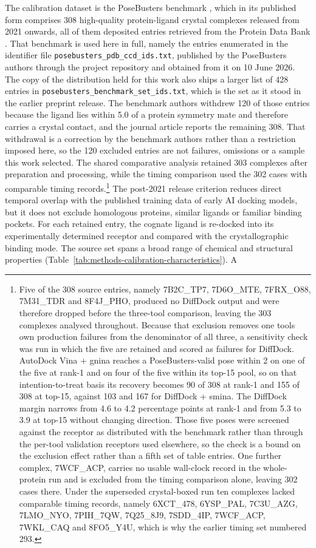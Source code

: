 The calibration dataset is the PoseBusters benchmark \cite{ref035}, which in its published form comprises 308 high-quality protein-ligand crystal complexes released from 2021 onwards, all of them deposited entries retrieved from the Protein Data Bank \cite{ref043}. That benchmark is used here in full, namely the entries enumerated in the identifier file \texttt{posebusters\_pdb\_ccd\_ids.txt}, published by the PoseBusters authors through the project repository and obtained from it on 10 June 2026. The copy of the distribution held for this work also ships a larger list of 428 entries in \texttt{posebusters\_benchmark\_set\_ids.txt}, which is the set as it stood in the earlier preprint release. The benchmark authors withdrew 120 of those entries because the ligand lies within 5.0 \angstrom{} of a protein symmetry mate and therefore carries a crystal contact, and the journal article reports the remaining 308. That withdrawal is a correction by the benchmark authors rather than a restriction imposed here, so the 120 excluded entries are not failures, omissions or a sample this work selected. The shared comparative analysis retained 303 complexes after preparation and processing, while the timing comparison used the 302 cases with comparable timing records.\footnote{Five of the 308 source entries, namely 7B2C\_TP7, 7D6O\_MTE, 7FRX\_O88, 7M31\_TDR and 8F4J\_PHO, produced no DiffDock output and were therefore dropped before the three-tool comparison, leaving the 303 complexes analysed throughout. Because that exclusion removes one tool\textquotesingle s own production failures from the denominator of all three, a sensitivity check was run in which the five are retained and scored as failures for DiffDock. AutoDock Vina + gnina reaches a PoseBusters-valid pose within 2 \angstrom{} on one of the five at rank-1 and on four of the five within its top-15 pool, so on that intention-to-treat basis its recovery becomes 90 of 308 at rank-1 and 155 of 308 at top-15, against 103 and 167 for DiffDock + smina. The DiffDock margin narrows from 4.6 to 4.2 percentage points at rank-1 and from 5.3 to 3.9 at top-15 without changing direction. Those five poses were screened against the receptor as distributed with the benchmark rather than through the per-tool validation receptors used elsewhere, so the check is a bound on the exclusion effect rather than a fifth set of table entries. One further complex, 7WCF\_ACP, carries no usable wall-clock record in the whole-protein run and is excluded from the timing comparison alone, leaving 302 cases there. Under the superseded crystal-boxed run ten complexes lacked comparable timing records, namely 6XCT\_478, 6YSP\_PAL, 7C3U\_AZG, 7LMO\_NYO, 7PIH\_7QW, 7Q25\_8J9, 7SDD\_4IP, 7WCF\_ACP, 7WKL\_CAQ and 8FO5\_Y4U, which is why the earlier timing set numbered 293.} The post-2021 release criterion reduces direct temporal overlap with the published training data of early AI docking models, but it does not exclude homologous proteins, similar ligands or familiar binding pockets. For each retained entry, the cognate ligand is re-docked into its experimentally determined receptor and compared with the crystallographic binding mode. The source set spans a broad range of chemical and structural properties (Table~\ref{tab:methods-calibration-characteristics}). A 